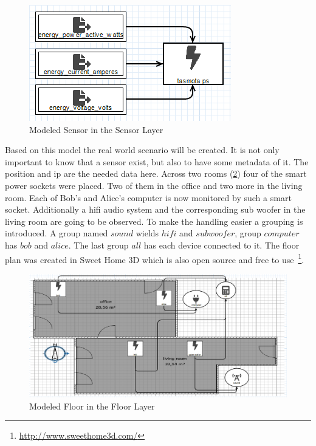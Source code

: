 \begin{figure}[!ht]
	\centering
	\includegraphics[width=.7\linewidth]{assets/images/sensorLayer}
	\caption{Modeled Sensor in the Sensor Layer}
	\label{fig:modeled_sensor_layer}
\end{figure}

Based on this model the real world scenario will be created. It is not only important to know that a sensor exist, but also to have some metadata of it. The position and ip are the needed data here. Across two rooms (\cref{fig:modeled_floor_layer}) four of the smart power sockets were placed. Two of them in the office and two more in the living room. Each of Bob's and Alice's computer is now monitored by such a smart socket. Additionally a \gls{hifi} audio system and the corresponding sub woofer in the living room are going to be observed. To make the handling easier a grouping is introduced. A group named $sound$ wields $hifi$ and $subwoofer$, group $computer$ has $bob$ and $alice$. The last group $all$ has each device connected to it. The floor plan was created in Sweet Home 3D which is also open source and free to use~\footnote{\url{http://www.sweethome3d.com/}}. 

\begin{figure}[!ht]
	\centering
	\includegraphics[width=\linewidth]{assets/images/floorLayer}
	\caption{Modeled Floor in the Floor Layer}
	\label{fig:modeled_floor_layer}
\end{figure}

